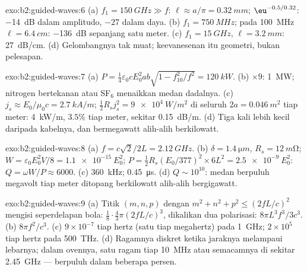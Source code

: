 \begin{solution}{exo:b2:guided-waves:6}
(a) $f_1 = \qty{150}{GHz} \gg f$: $\ell \approx a/\pi = \qty{0.32}{mm}$; $\eu^{-0.5/0.32}$:
\qty{-14}{dB} dalam amplitudo, $-27$ dalam daya. (b) $f_1 = \qty{750}{MHz}$; pada \qty{100}{MHz}
$\ell = \qty{6.4}{cm}$: \qty{-136}{dB} sepanjang satu meter. (c) $f_1 = \qty{15}{GHz}$, $\ell =
\qty{3.2}{mm}$: \qty{27}{dB/cm}. (d) Gelombangnya tak muat; keevanesenan itu
geometri, bukan pelesapan.
\end{solution}

\begin{solution}{exo:b2:guided-waves:7}
(a) $P = \tfrac14\varepsilon_0cE_0^2ab\sqrt{1 - f_{10}^2/f^2} = \qty{120}{kW}$. (b) $\times9$:
\qty{1}{MW}; nitrogen bertekanan atau SF$_6$ menaikkan medan dadalnya. (c)
$j_s \approx E_0/\mu_0c = \qty{2.7}{kA/m}$; $\tfrac12R_sj_s^2 = \qty{9e4}{W/m^2}$ di seluruh $2a =
\qty{0.046}{m^2}$ tiap meter: \qty{4}{kW/m}, $3.5\%$ tiap meter, sekitar \qty{0.15}{dB/m}.
(d) Tiga kali lebih kecil daripada kabelnya, dan bermegawatt alih-alih
berkilowatt.
\end{solution}

\begin{solution}{exo:b2:guided-waves:8}
(a) $f = c\sqrt2/2L = \qty{2.12}{GHz}$. (b) $\delta = \qty{1.4}{\micro m}$, $R_s = \qty{12}{m\ohm}$;
$W = \varepsilon_0E_0^2V/8 = \qty{1.1e-15}{}E_0^2$; $P = \tfrac12R_s(E_0/377)^2 \times 6L^2 =
\qty{2.5e-9}{}E_0^2$: $Q = \omega W/P \approx 6000$. (c) \qty{360}{kHz}; \qty{0.45}{\micro s}. (d)
$Q \sim 10^{10}$: medan berpuluh megavolt tiap meter ditopang
berkilowatt alih-alih bergigawatt.
\end{solution}

\begin{solution}{exo:b2:guided-waves:9}
(a) Titik $(m, n, p)$ dengan $m^2 + n^2 + p^2 \le (2fL/c)^2$ mengisi seperdelapan
bola: $\tfrac18\cdot\tfrac43\pi(2fL/c)^3$, dikalikan dua polarisasi:
$8\pi L^3f^3/3c^3$. (b) $8\pi f^2/c^3$. (c) $9 \times 10^{-7}$ tiap hertz (satu tiap
megahertz) pada \qty{1}{GHz}; $2 \times 10^5$ tiap hertz pada \qty{500}{THz}. (d) Ragamnya
diskret ketika jaraknya melampaui lebarnya; dalam ovennya, satu ragam
tiap \qty{10}{MHz} atau semacamnya di sekitar \qty{2.45}{GHz} --- berpuluh dalam beberapa
persen.
\end{solution}

